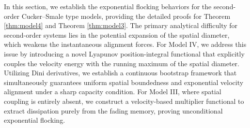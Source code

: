 \documentclass[11pt]{amsart}
\numberwithin{equation}{section}
\begin{document}
In this section, we establish the exponential flocking behaviors for the second-order Cucker--Smale type models, providing the detailed proofs for Theorem \ref{thm:model4} and Theorem \ref{thm:model3}. The primary analytical difficulty for second-order systems lies in the potential expansion of the spatial diameter, which weakens the instantaneous alignment forces. For Model IV, we address this issue by introducing a novel Lyapunov position-integral functional that explicitly couples the velocity energy with the running maximum of the spatial diameter. Utilizing Dini derivatives, we establish a continuous bootstrap framework that simultaneously guarantees uniform spatial boundedness and exponential velocity alignment under a sharp capacity condition. For Model III, where spatial coupling is entirely absent, we construct a velocity-based multiplier functional to extract dissipation purely from the fading memory, proving unconditional exponential flocking.
\end{document}

